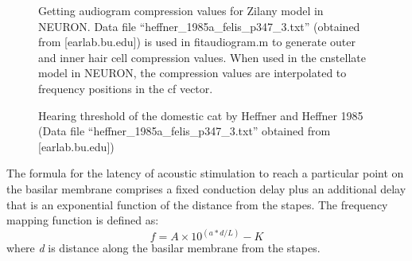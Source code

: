 \begin{figure}[htb]
  \begin{center}
    \caption{Getting audiogram compression values for Zilany model in
      NEURON\@. Data file \mbox{\textsf{``heffner\_1985a\_felis\_p347\_3.txt''}} (obtained
      from [earlab.bu.edu]) is used in \textsf{fitaudiogram.m} to generate outer
      and inner hair cell compression values. When used in the
      \textsf{cnstellate} model in NEURON, the compression values are
      interpolated to frequency positions in the \textsf{cf}
      vector.}\label{fig:GetAudiogram}
  \end{center}
\end{figure}



\medskip{}

\begin{figure}[htb]
  \begin{center}
    \caption{Hearing threshold of the domestic cat by Heffner and Heffner 1985
      \citep{HeffnerHeffner:1985} (Data file
      \mbox{\textsf{``heffner\_1985a\_felis\_p347\_3.txt''}} obtained from
      [earlab.bu.edu])}
    \label{fig:AudThresholdRat}
  \end{center}
\end{figure}


The formula for the latency of acoustic stimulation to reach a particular point
on the basilar membrane comprises a fixed conduction delay plus an additional
delay that is an exponential function of the distance from the stapes. The
frequency mapping function is defined as:
\begin{equation}
  \label{eq:delay}
 f = A\times10^{\left(a*d/L\right)} - K  
\end{equation}
where \emph{d} is distance along the basilar membrane from the stapes.

